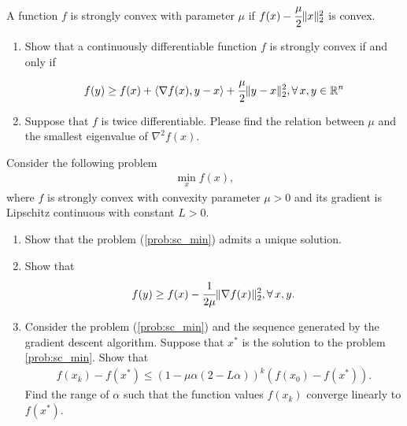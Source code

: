 \documentclass[11pt,letter,notitlepage]{article}
\begin{document}
\begin{exercise}
    A function $f$ is strongly convex with parameter $\mu$ if $f(x)-\cfrac{\mu}{2}\|x\|_2^2$ is convex.
    \begin{enumerate}
        \item Show that a continuously differentiable function $f$ is strongly convex if and only if
              \begin{align*}
                  f(y)\ge f(x)+\langle\nabla f(x),y-x\rangle+\cfrac{\mu}{2}\|y-x\|_2^2, \forall\, x,y\in\mathbb{R}^n
              \end{align*}
        \item Suppose that $f$ is twice differentiable. Please find the relation between $\mu$ and the smallest eigenvalue of $\nabla^2f(x)$.
    \end{enumerate}

    \noindent Consider the following problem
    \begin{align}\label{prob:sc_min}
        \min_{x}f(x),
    \end{align}
    where $f$ is strongly convex with convexity parameter $\mu>0$ and its gradient is Lipschitz continuous with constant $L>0$.
    \begin{enumerate}[resume]
        \item Show that the problem (\ref{prob:sc_min}) admits a unique solution.
        \item Show that
              \begin{align*}
                  f(y)\ge f(x)-\cfrac{1}{2\mu}\|\nabla f(x)\|_2^2, \forall\, x,y.
              \end{align*}
        \item Consider the problem (\ref{prob:sc_min}) and the sequence generated by the gradient descent algorithm. Suppose that $x^*$ is the solution to the problem \ref{prob:sc_min}. Show that
              \begin{align*}
                  f(x_k)-f(x^*)\le (1-\mu\alpha(2-L\alpha))^k(f(x_0)-f(x^*)).
              \end{align*}
              Find the range of $\alpha$ such that the function values $f(x_k)$ converge linearly to  $f(x^*)$.
    \end{enumerate}
\end{exercise}
\end{document}
